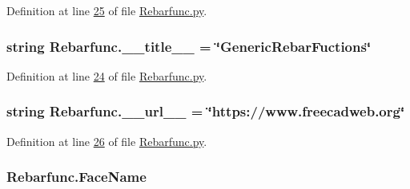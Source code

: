 Definition at line \hyperlink{Rebarfunc_8py_source_l00025}{25} of file \hyperlink{Rebarfunc_8py_source}{Rebarfunc.\+py}.

\subsubsection[{\texorpdfstring{\+\_\+\+\_\+title\+\_\+\+\_\+}{__title__}}]{\setlength{\rightskip}{0pt plus 5cm}string Rebarfunc.\+\_\+\+\_\+title\+\_\+\+\_\+ = \char`\"{}Generic\+Rebar\+Fuctions\char`\"{}\hspace{0.3cm}{\ttfamily [private]}}\hypertarget{namespaceRebarfunc_abd5b4d35a8537923b223274433b692e9}{}\label{namespaceRebarfunc_abd5b4d35a8537923b223274433b692e9}


Definition at line \hyperlink{Rebarfunc_8py_source_l00024}{24} of file \hyperlink{Rebarfunc_8py_source}{Rebarfunc.\+py}.

\subsubsection[{\texorpdfstring{\+\_\+\+\_\+url\+\_\+\+\_\+}{__url__}}]{\setlength{\rightskip}{0pt plus 5cm}string Rebarfunc.\+\_\+\+\_\+url\+\_\+\+\_\+ = \char`\"{}https\+://www.\+freecadweb.\+org\char`\"{}\hspace{0.3cm}{\ttfamily [private]}}\hypertarget{namespaceRebarfunc_a11e5d55bb1ddb9fe8f97d06b7916bb22}{}\label{namespaceRebarfunc_a11e5d55bb1ddb9fe8f97d06b7916bb22}


Definition at line \hyperlink{Rebarfunc_8py_source_l00026}{26} of file \hyperlink{Rebarfunc_8py_source}{Rebarfunc.\+py}.

\subsubsection[{\texorpdfstring{Face\+Name}{FaceName}}]{\setlength{\rightskip}{0pt plus 5cm}Rebarfunc.\+Face\+Name}\hypertarget{namespaceRebarfunc_aa191391fe61fc3fff160a228d66910fc}{}\label{namespaceRebarfunc_aa191391fe61fc3fff160a228d66910fc}


